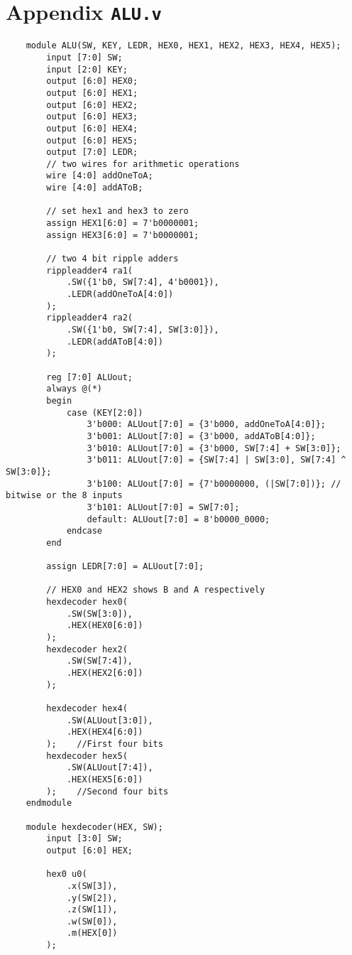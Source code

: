 \documentclass[oneside, 10pt]{book}
\begin{document}
\section{Appendix \texttt{ALU.v}}
\begin{verbatim}
    module ALU(SW, KEY, LEDR, HEX0, HEX1, HEX2, HEX3, HEX4, HEX5);
        input [7:0] SW;
        input [2:0] KEY;
        output [6:0] HEX0;
        output [6:0] HEX1;
        output [6:0] HEX2;
        output [6:0] HEX3;
        output [6:0] HEX4;
        output [6:0] HEX5;
        output [7:0] LEDR;
        // two wires for arithmetic operations
        wire [4:0] addOneToA;
        wire [4:0] addAToB;

        // set hex1 and hex3 to zero
        assign HEX1[6:0] = 7'b0000001;
        assign HEX3[6:0] = 7'b0000001;
        
        // two 4 bit ripple adders 
        rippleadder4 ra1(
            .SW({1'b0, SW[7:4], 4'b0001}), 
            .LEDR(addOneToA[4:0])
        );
        rippleadder4 ra2(
            .SW({1'b0, SW[7:4], SW[3:0]}), 
            .LEDR(addAToB[4:0])
        );

        reg [7:0] ALUout;
        always @(*)
        begin
            case (KEY[2:0])
                3'b000: ALUout[7:0] = {3'b000, addOneToA[4:0]};
                3'b001: ALUout[7:0] = {3'b000, addAToB[4:0]};
                3'b010: ALUout[7:0] = {3'b000, SW[7:4] + SW[3:0]};
                3'b011: ALUout[7:0] = {SW[7:4] | SW[3:0], SW[7:4] ^ SW[3:0]};
                3'b100: ALUout[7:0] = {7'b0000000, (|SW[7:0])}; // bitwise or the 8 inputs
                3'b101: ALUout[7:0] = SW[7:0];
                default: ALUout[7:0] = 8'b0000_0000;
            endcase
        end
            
        assign LEDR[7:0] = ALUout[7:0];
        
        // HEX0 and HEX2 shows B and A respectively
        hexdecoder hex0(
            .SW(SW[3:0]), 
            .HEX(HEX0[6:0])
        );
        hexdecoder hex2(
            .SW(SW[7:4]), 
            .HEX(HEX2[6:0])
        );

        hexdecoder hex4(
            .SW(ALUout[3:0]), 
            .HEX(HEX4[6:0])
        );    //First four bits
        hexdecoder hex5(
            .SW(ALUout[7:4]), 
            .HEX(HEX5[6:0])
        );    //Second four bits
    endmodule

    module hexdecoder(HEX, SW);
        input [3:0] SW;
        output [6:0] HEX;

        hex0 u0(
            .x(SW[3]),
            .y(SW[2]),
            .z(SW[1]),
            .w(SW[0]),
            .m(HEX[0])
        );
        

\end{verbatim}
\end{document}

